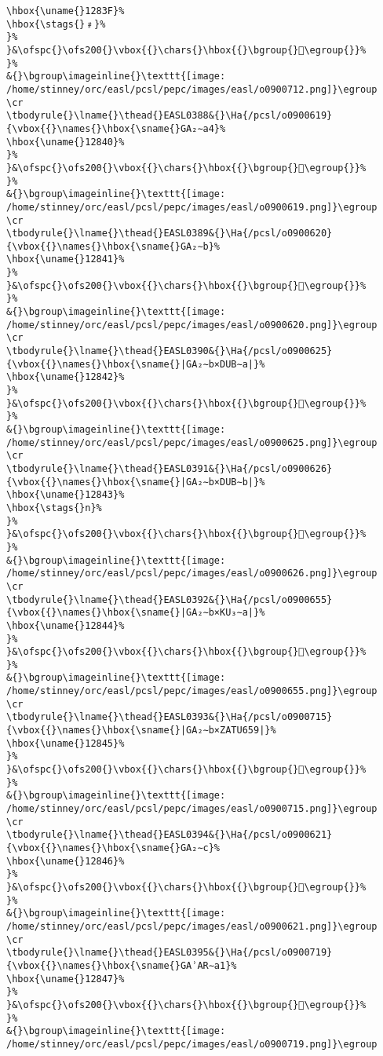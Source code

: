 \begin{verbatim}
\hbox{\uname{}1283F}%
\hbox{\stags{}﹟}%
}%
}&\ofspc{}\ofs200{}\vbox{{}\chars{}\hbox{{}\bgroup{}𒠿\egroup{}}%
}%
&{}\bgroup\imageinline{}\texttt{[image: /home/stinney/orc/easl/pcsl/pepc/images/easl/o0900712.png]}\egroup
\cr
\tbodyrule{}\lname{}\thead{}EASL0388&{}\Ha{/pcsl/o0900619}{\vbox{{}\names{}\hbox{\sname{}GA₂∼a4}%
\hbox{\uname{}12840}%
}%
}&\ofspc{}\ofs200{}\vbox{{}\chars{}\hbox{{}\bgroup{}𒡀\egroup{}}%
}%
&{}\bgroup\imageinline{}\texttt{[image: /home/stinney/orc/easl/pcsl/pepc/images/easl/o0900619.png]}\egroup
\cr
\tbodyrule{}\lname{}\thead{}EASL0389&{}\Ha{/pcsl/o0900620}{\vbox{{}\names{}\hbox{\sname{}GA₂∼b}%
\hbox{\uname{}12841}%
}%
}&\ofspc{}\ofs200{}\vbox{{}\chars{}\hbox{{}\bgroup{}𒡁\egroup{}}%
}%
&{}\bgroup\imageinline{}\texttt{[image: /home/stinney/orc/easl/pcsl/pepc/images/easl/o0900620.png]}\egroup
\cr
\tbodyrule{}\lname{}\thead{}EASL0390&{}\Ha{/pcsl/o0900625}{\vbox{{}\names{}\hbox{\sname{}|GA₂∼b×DUB∼a|}%
\hbox{\uname{}12842}%
}%
}&\ofspc{}\ofs200{}\vbox{{}\chars{}\hbox{{}\bgroup{}𒡂\egroup{}}%
}%
&{}\bgroup\imageinline{}\texttt{[image: /home/stinney/orc/easl/pcsl/pepc/images/easl/o0900625.png]}\egroup
\cr
\tbodyrule{}\lname{}\thead{}EASL0391&{}\Ha{/pcsl/o0900626}{\vbox{{}\names{}\hbox{\sname{}|GA₂∼b×DUB∼b|}%
\hbox{\uname{}12843}%
\hbox{\stags{}n}%
}%
}&\ofspc{}\ofs200{}\vbox{{}\chars{}\hbox{{}\bgroup{}𒡃\egroup{}}%
}%
&{}\bgroup\imageinline{}\texttt{[image: /home/stinney/orc/easl/pcsl/pepc/images/easl/o0900626.png]}\egroup
\cr
\tbodyrule{}\lname{}\thead{}EASL0392&{}\Ha{/pcsl/o0900655}{\vbox{{}\names{}\hbox{\sname{}|GA₂∼b×KU₃∼a|}%
\hbox{\uname{}12844}%
}%
}&\ofspc{}\ofs200{}\vbox{{}\chars{}\hbox{{}\bgroup{}𒡄\egroup{}}%
}%
&{}\bgroup\imageinline{}\texttt{[image: /home/stinney/orc/easl/pcsl/pepc/images/easl/o0900655.png]}\egroup
\cr
\tbodyrule{}\lname{}\thead{}EASL0393&{}\Ha{/pcsl/o0900715}{\vbox{{}\names{}\hbox{\sname{}|GA₂∼b×ZATU659|}%
\hbox{\uname{}12845}%
}%
}&\ofspc{}\ofs200{}\vbox{{}\chars{}\hbox{{}\bgroup{}𒡅\egroup{}}%
}%
&{}\bgroup\imageinline{}\texttt{[image: /home/stinney/orc/easl/pcsl/pepc/images/easl/o0900715.png]}\egroup
\cr
\tbodyrule{}\lname{}\thead{}EASL0394&{}\Ha{/pcsl/o0900621}{\vbox{{}\names{}\hbox{\sname{}GA₂∼c}%
\hbox{\uname{}12846}%
}%
}&\ofspc{}\ofs200{}\vbox{{}\chars{}\hbox{{}\bgroup{}𒡆\egroup{}}%
}%
&{}\bgroup\imageinline{}\texttt{[image: /home/stinney/orc/easl/pcsl/pepc/images/easl/o0900621.png]}\egroup
\cr
\tbodyrule{}\lname{}\thead{}EASL0395&{}\Ha{/pcsl/o0900719}{\vbox{{}\names{}\hbox{\sname{}GAʾAR∼a1}%
\hbox{\uname{}12847}%
}%
}&\ofspc{}\ofs200{}\vbox{{}\chars{}\hbox{{}\bgroup{}𒡇\egroup{}}%
}%
&{}\bgroup\imageinline{}\texttt{[image: /home/stinney/orc/easl/pcsl/pepc/images/easl/o0900719.png]}\egroup

\end{verbatim}
